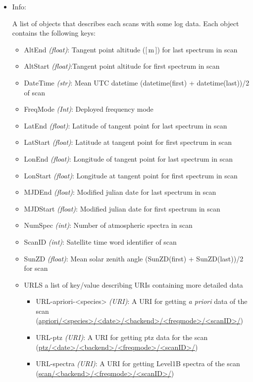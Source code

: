 \begin{itemize}
    \item Info:

        A list of objects that describes each scans
        with some log data.  
        Each object contains the following keys:

        \begin{itemize}
            \item AltEnd \emph{(float)}: Tangent point altitude ([\,m\,]) for last spectrum in scan
            \item AltStart \emph{(float)}:Tangent point altitude for first spectrum in scan
            \item DateTime \emph{(str)}: Mean UTC datetime (datetime(first) + datetime(last))/2 of scan
            \item FreqMode \emph{(Int)}: Deployed frequency mode
            \item LatEnd \emph{(float)}: Latitude of tangent point for last spectrum in scan
            \item LatStart \emph{(float)}: Latitude at tangent point for first spectrum in scan
            \item LonEnd \emph{(float)}: Longitude of tangent point for last spectrum in scan
            \item LonStart \emph{(float)}: Longitude at tangent point for first spectrum in scan
            \item MJDEnd \emph{(float)}: Modified julian date for last spectrum in scan
            \item MJDStart \emph{(float)}: Modified julian date for first spectrum in scan
            \item NumSpec \emph{(int)}: Number of atmospheric spectra in scan
            \item ScanID \emph{(int)}: Satellite time word identifier of scan
            \item SunZD \emph{(float)}: Mean solar zenith angle  (SunZD(first) + SunZD(last))/2 for scan
            \item URLS a list of key/value describing URIs containing
            more detailed data
            \begin{itemize} 
                \item URL-apriori-<species> \emph{(URI)}: 
                A URI for getting \textit{a priori} data of the scan\\
                (\url{apriori/<species>/<date>/<backend>/<freqmode>/<scanID>/})
                \item URL-ptz \emph{(URI)}: A URI for getting ptz data for the scan\\
                (\url{ptz/<date>/<backend>/<freqmode>/<scanID>/})
                \item URL-spectra \emph{(URI)}: A URI for getting Level1B spectra of the scan\\         
                (\url{scan/<backend>/<freqmode>/<scanID>/})        
            \end{itemize}
       \end{itemize}   
\end{itemize}

